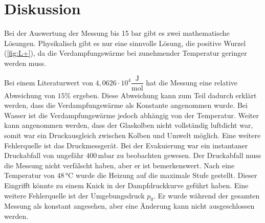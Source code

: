 \section{Diskussion}
\label{sec:Diskussion}
Bei der Auswertung der Messung bis 15 $\unit{\bar}$ gibt es zwei mathematische Lösungen. Physikalisch gibt es nur eine sinnvolle Lösung, die positive Wurzel (\autoref{fig:L+}), da die Verdampfungswärme bei zunehmender Temperatur geringer werden muss. 

Bei einem Literaturwert von ${4,0626} \cdot 10^4 \dfrac{\unit{\joule}}{\unit{\mol}}$ \cite{chemiede} hat die Messung eine relative Abweichung von $15\%$ ergeben.
Diese Abweichung kann zum Teil dadurch erklärt werden, dass die Verdampfungswärme als Konstante angenommen wurde.
Bei Wasser ist die Verdampfungswärme jedoch abhängig von der Temperatur.
Weiter kann angenommen werden, dass der Glaskolben nicht vollständig luftdicht war, somit war ein Druckausgleich zwischen Kolben und Umwelt möglich.
Eine weitere Fehlerquelle ist das Druckmessgerät. Bei der Evakuierung war ein instantaner Druckabfall von ungefähr $400 \,\unit{\milli\bar}$ zu beobachten gewesen.
Der Druckabfall muss die Messung nicht verfälscht haben, aber er ist bemerkenswert.
Nach eine Temperatur von $48 \,\unit{\celsius}$ wurde die Heizung auf die maximale Stufe gestellt. Dieser Eingrifft könnte zu einem Knick in der Dampfdruckkurve geführt haben.
Eine weitere Fehlerquelle ist der Umgebungsdruck $p_0$. Er wurde während der gesamten Messung als konstant angesehen, aber eine Änderung kann nicht ausgeschlossen werden.